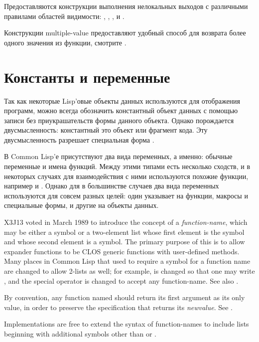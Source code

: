 Предоставляются конструкции выполнения нелокальных выходов с различными 
правилами областей видимости: , , ,
 и .

Конструкции multiple-value предоставляют удобный способ для возврата более одного
значения из функции, смотрите .

\section{Константы и переменные}
\label{FUNCTION-NAME-SECTION}

Так как некоторые Lisp'овые объекты данных используются для отображения
программ, можно всегда обозначить константный объект данных с помощью записи
без приукрашательств формы данного объекта. Однако порождается двусмысленность:
константный это объект или фрагмент кода. Эту двусмысленность разрешает
специальная форма .

В Common Lisp'е присутствуют два вида переменных, а именно: обычные переменные и
имена функций. Между этими типами есть несколько сходств, и в некоторых случаях
для взаимодействия с ними используются похожие функции, например  и
. 
Однако для в большинстве случаев два вида переменных используются для совсем
разных целей: один указывает на функции, макросы и специальные формы, и другие
на объекты данных.

\begin{newer}
X3J13 voted in March 1989  to introduce the concept
of a \emph{function-name}, which may be either a symbol or a two-element list whose
first element is the symbol  and whose second element is a symbol.
The primary purpose of this is to allow  expander functions to be
CLOS generic functions with user-defined methods.
Many places in Common Lisp that used to require a symbol for a function
name are changed to allow 2-lists as well; for example, 
is changed so that one may write ,
and the  special operator is changed to accept any function-name.
See also .

By convention, any function named  should return its first
argument as its only value, in order to preserve the specification that
 returns its \emph{newvalue}.  See .

Implementations are free to extend the syntax of function-names to
include lists beginning with additional symbols other than 
or .
\end{newer}

